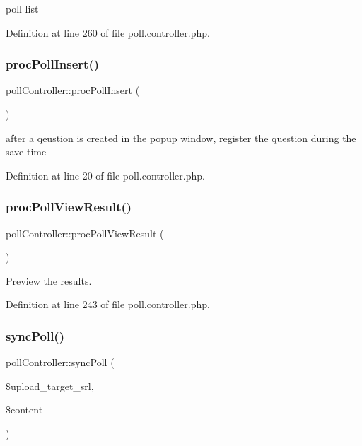 poll list 



Definition at line 260 of file poll.\+controller.\+php.

\hypertarget{classpollController_a22722ed2a0810a54f9abfd098cd3d25c}{}\label{classpollController_a22722ed2a0810a54f9abfd098cd3d25c} 
\subsubsection{\texorpdfstring{proc\+Poll\+Insert()}{procPollInsert()}}
{\footnotesize\ttfamily poll\+Controller\+::proc\+Poll\+Insert (\begin{DoxyParamCaption}{ }\end{DoxyParamCaption})}



after a qeustion is created in the popup window, register the question during the save time 



Definition at line 20 of file poll.\+controller.\+php.

\hypertarget{classpollController_a0fedbcad279a12cdf95a0f1d878bbfea}{}\label{classpollController_a0fedbcad279a12cdf95a0f1d878bbfea} 
\subsubsection{\texorpdfstring{proc\+Poll\+View\+Result()}{procPollViewResult()}}
{\footnotesize\ttfamily poll\+Controller\+::proc\+Poll\+View\+Result (\begin{DoxyParamCaption}{ }\end{DoxyParamCaption})}



Preview the results. 



Definition at line 243 of file poll.\+controller.\+php.

\hypertarget{classpollController_a9a22d9c1e70e7fdf3d635cc4e02fe8f7}{}\label{classpollController_a9a22d9c1e70e7fdf3d635cc4e02fe8f7} 
\subsubsection{\texorpdfstring{sync\+Poll()}{syncPoll()}}
{\footnotesize\ttfamily poll\+Controller\+::sync\+Poll (\begin{DoxyParamCaption}\item[{}]{\$upload\+\_\+target\+\_\+srl,  }\item[{}]{\$content }\end{DoxyParamCaption})}



